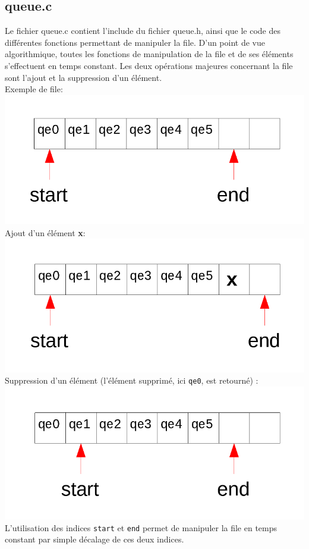 \documentclass[a4paper]{article}
\begin{document}
\subsection{queue.c}
Le fichier queue.c contient l'include du fichier queue.h, ainsi que le code des différentes fonctions permettant de manipuler la file.
D'un point de vue algorithmique, toutes les fonctions de manipulation de la file et de ses éléments s'effectuent en temps constant.
Les deux opérations majeures concernant la file sont l'ajout et la suppression d'un élément.
\\Exemple de file:
\\\includegraphics[scale=0.35]{img/file.png}
\\Ajout d'un élément \textbf{x}:
\\\includegraphics[scale=0.35]{img/file1.png}
\\Suppression d'un élément (l'élément supprimé, ici \texttt{qe0}, est retourné) :
\\\includegraphics[scale=0.35]{file2.png}
\\L'utilisation des indices \texttt{start} et \texttt{end} permet de manipuler la file en temps constant par simple décalage de ces deux indices.
\end{document}
